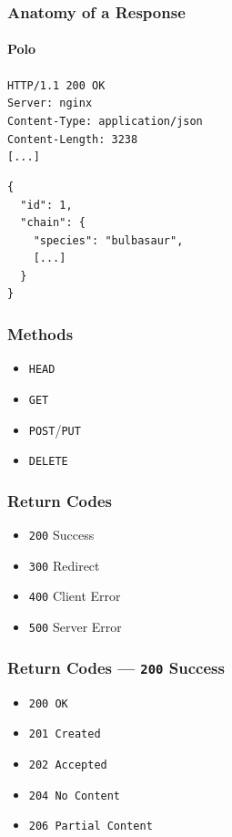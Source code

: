 \documentclass[dvipsnames]{beamer}
\begin{document}
\begin{frame}[fragile=singleslide]
  \frametitle{Anatomy of a Response}
  \framesubtitle{Polo}

  \texttt{{\color{blue}HTTP/1.1} \color{orange}200 OK} \\
  {
    \color{olive}
    \texttt{Server: nginx} \\
    \texttt{Content-Type: application/json} \\
    \texttt{Content-Length: 3238} \\
    \texttt{[...]} \\
  } \bigskip

  {
    \color{violet}
    \begin{verbatim}
{
  "id": 1,
  "chain": {
    "species": "bulbasaur",
    [...]
  }
}
    \end{verbatim}
  }
\end{frame}


\begin{frame}
  \frametitle{Methods}
  \begin{itemize}
    \item \texttt{HEAD}
    \item \texttt{GET}
    \item \texttt{POST}/\texttt{PUT}
    \item \texttt{DELETE}
  \end{itemize}
\end{frame}


\begin{frame}
  \frametitle{Return Codes}
  \begin{itemize}
    \item \texttt{200} Success 
    \item \texttt{300} Redirect
    \item \texttt{400} Client Error
    \item \texttt{500} Server Error
  \end{itemize}
\end{frame}


\begin{frame}
  \frametitle{Return Codes --- \texttt{200} Success}
  \begin{itemize}
    \item \texttt{200 OK}
    \item \texttt{201 Created}
    \item \texttt{202 Accepted}
    \item \texttt{204 No Content}
    \item \texttt{206 Partial Content}
  \end{itemize}
\end{frame}
\end{document}
